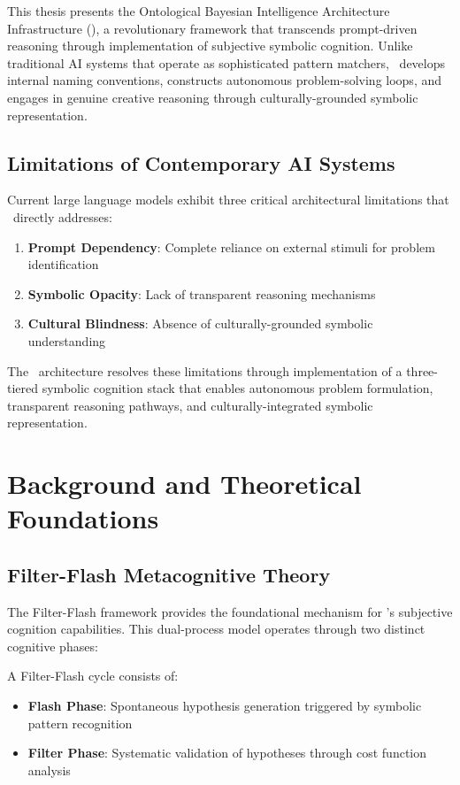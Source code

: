 \documentclass[12pt,twoside,openright]{report}
\begin{document}
This thesis presents the Ontological Bayesian Intelligence Architecture Infrastructure (\obiai), a revolutionary framework that transcends prompt-driven reasoning through implementation of subjective symbolic cognition. Unlike traditional AI systems that operate as sophisticated pattern matchers, \obiai\ develops internal naming conventions, constructs autonomous problem-solving loops, and engages in genuine creative reasoning through culturally-grounded symbolic representation.

\section{Limitations of Contemporary AI Systems}

Current large language models exhibit three critical architectural limitations that \obiai\ directly addresses:

\begin{enumerate}
\item \textbf{Prompt Dependency}: Complete reliance on external stimuli for problem identification
\item \textbf{Symbolic Opacity}: Lack of transparent reasoning mechanisms
\item \textbf{Cultural Blindness}: Absence of culturally-grounded symbolic understanding
\end{enumerate}

The \obiai\ architecture resolves these limitations through implementation of a three-tiered symbolic cognition stack that enables autonomous problem formulation, transparent reasoning pathways, and culturally-integrated symbolic representation.

\chapter{Background and Theoretical Foundations}

\section{Filter-Flash Metacognitive Theory}

The Filter-Flash framework provides the foundational mechanism for \obiai's subjective cognition capabilities. This dual-process model operates through two distinct cognitive phases:

\begin{definition}
A Filter-Flash cycle consists of:
\begin{itemize}
\item \textbf{Flash Phase}: Spontaneous hypothesis generation triggered by symbolic pattern recognition
\item \textbf{Filter Phase}: Systematic validation of hypotheses through cost function analysis
\end{itemize}
\end{definition}
\end{document}
